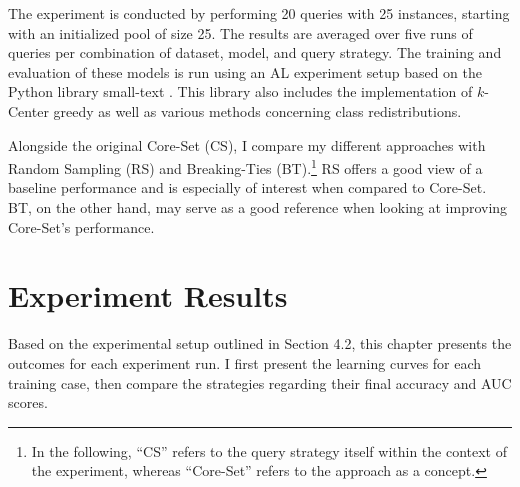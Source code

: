 \documentclass[english,bachelor,ul]{webisthesis} %
\begin{document}
The experiment is conducted by performing 20 queries with 25 instances, starting with an initialized pool of size 25. The results are averaged over five runs of queries per combination of dataset, model, and query strategy. The training and evaluation of these models is run using an AL experiment setup based on the Python library small-text \citep{schroeder2023small-text}. This library also includes the implementation of $k$-Center greedy as well as various methods concerning class redistributions.

Alongside the original Core-Set (CS), I compare my different approaches with Random Sampling (RS) and Breaking-Ties (BT).\footnote{In the following, ``CS'' refers to the query strategy itself within the context of the experiment, whereas ``Core-Set'' refers to the approach as a concept.} RS offers a good view of a baseline performance and is especially of interest when compared to Core-Set. BT, on the other hand, may serve as a good reference when looking at improving Core-Set's performance.

\section{Experiment Results}

Based on the experimental setup outlined in Section 4.2, this chapter presents the outcomes for each experiment run. I first present the learning curves for each training case, then compare the strategies regarding their final accuracy and AUC scores.
\end{document}
